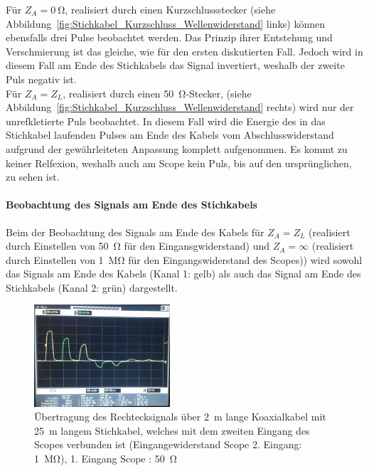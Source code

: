 \documentclass[a4paper,twoside,final]{article}
\begin{document}
Für $Z_A = \SI{0}{\ohm}$, realisiert durch einen Kurzschlussstecker (siehe Abbildung~\ref{fig:Stichkabel_Kurzschluss_Wellenwiderstand} links) können ebensfalls drei Pulse beobachtet werden. Das Prinzip ihrer Entstehung und \glqq Verschmierung\grqq{} ist das gleiche, wie für den ersten diskutierten Fall. Jedoch wird in diesem Fall am Ende des Stichkabels das Signal invertiert, weshalb der zweite Puls negativ ist. \\
Für $Z_A = Z_L$, realisiert durch einen \SI{50}{\ohm}-Stecker, (siehe Abbildung~\ref{fig:Stichkabel_Kurzschluss_Wellenwiderstand} rechts) wird nur der unrefkletierte Puls beobachtet. In diesem Fall wird die Energie des in das Stichkabel laufenden Pulses am Ende des Kabels vom Abschlusswiderstand aufgrund der gewährleiteten Anpassung komplett aufgenommen. Es kommt zu keiner Relfexion, weshalb auch am Scope kein Puls, bis auf den ursprünglichen, zu sehen ist.

\paragraph{Beobachtung des Signals am Ende des Stichkabels }
Beim der Beobachtung des Signals am Ende des Kabels für $Z_A = Z_L$ (realisiert durch Einstellen von \SI{50}{\ohm} für den Eingansgwiderstand) und $Z_A = \infty$ (realisiert durch Einstellen von \SI{1}{\mega\ohm} für den Eingangswiderstand des Scopes)) wird sowohl das Signals am Ende des Kabels (Kanal 1: gelb) als auch das Signal am Ende des Stichkabels (Kanal 2: grün) dargestellt.\\

\begin{figure}[htp]
    \centering
        \includegraphics[width=0.45\textwidth]{Bilder/Bild7.jpg}
    \caption{Übertragung des Rechtecksignals über \SI{2}{\metre} lange Koaxialkabel mit \SI{25}{\metre} langem Stichkabel, welches mit dem zweiten Eingang des Scopes verbunden ist (Eingangewiderstand Scope 2. Eingang: \SI{1}{\mega\ohm}), 1. Eingang Scope : \SI{50}{\ohm}}
\end{figure}
\end{document}
